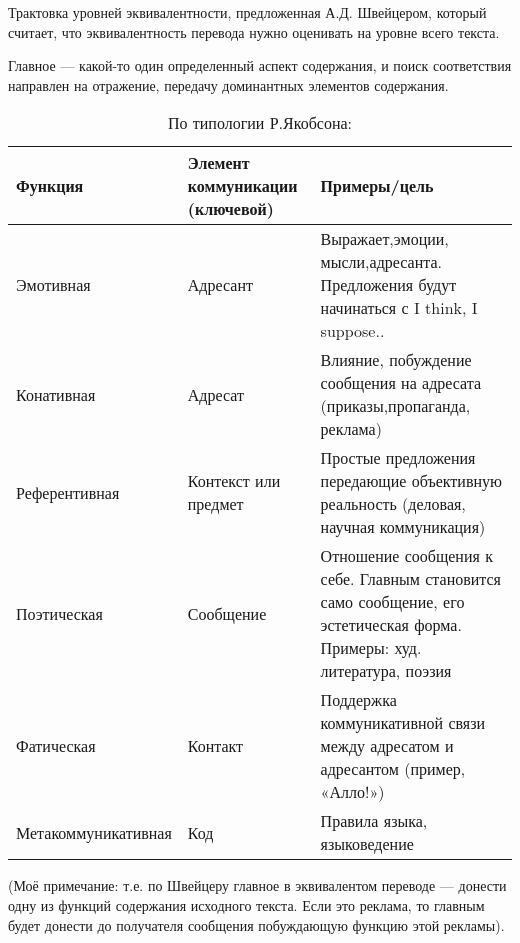 Трактовка уровней эквивалентности, предложенная А.Д. Швейцером, который считает, что эквивалентность перевода нужно оценивать на уровне всего текста.  

Главное --- какой-то один определенный аспект содержания, и поиск соответствия направлен на отражение, передачу доминантных элементов содержания.

\begin{table}[!h]
	\small
	\centering
	\caption*{По типологии Р.Якобсона:}
	\setlength{\extrarowheight}{2mm}
	\begin{tabular}{lll}
		 \toprule
		Функция             & \parbox{4cm}{Элемент коммуникации (ключевой)} & Примеры/цель                                                                                                            \\ \midrule
		Эмотивная           & Адресант                        & \parbox{8cm}{Выражает,эмоции, мысли,адресанта. Предложения будут начинаться с I think, I suppose..}                                   \\ %
		Конативная          & Адресат                         & \parbox{8cm}{Влияние, побуждение  сообщения на адресата (приказы,пропаганда, реклама)}                                                \\ %
		Референтивная       & Контекст или предмет            & \parbox{8cm}{Простые предложения передающие объективную реальность (деловая, научная коммуникация)}                                   \\ %
		Поэтическая         & Сообщение                       & \parbox{8cm}{Отношение сообщения к себе. Главным становится само сообщение, его эстетическая форма. Примеры: худ. литература, поэзия} \\ %
		Фатическая          & Контакт                         & \parbox{8cm}{Поддержка коммуникативной связи между адресатом и адресантом (пример, «Алло!»)}    \\ %
		Метакоммуникативная & Код                             & Правила языка, языковедение                    \\ \bottomrule                                                                        
	\end{tabular}
\end{table}
{\small (Моё примечание: т.е. по Швейцеру главное в эквивалентом переводе --- донести одну из функций содержания исходного текста. Если это реклама, то главным будет донести до получателя сообщения побуждающую функцию этой рекламы).}

